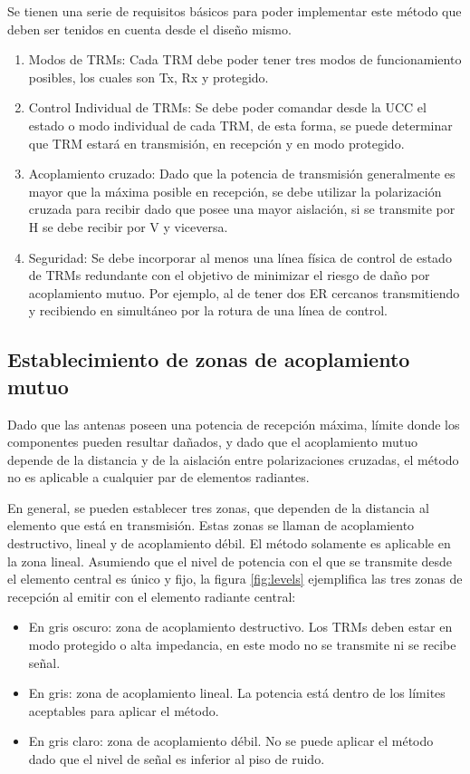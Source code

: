 Se tienen una serie de requisitos básicos para poder implementar este método que deben ser tenidos en cuenta desde el diseño
mismo.

\begin{enumerate}
	\item Modos de TRMs: Cada TRM debe poder tener tres modos de funcionamiento posibles, los cuales son Tx, Rx y protegido.
	\item Control Individual de TRMs: Se debe poder comandar desde la UCC el estado o modo individual de cada TRM, de esta forma, 
		se puede determinar que TRM estará en transmisión, en recepción y en modo protegido.
	\item Acoplamiento cruzado: Dado que la potencia de transmisión generalmente es mayor que la máxima posible en recepción, se
		debe utilizar la polarización cruzada para recibir dado que posee una mayor aislación, si se transmite por H se debe recibir
		por V y viceversa.
	\item Seguridad: Se debe incorporar al menos una línea física de control de estado de TRMs redundante con el objetivo de
		minimizar el riesgo de daño por acoplamiento mutuo. Por ejemplo, al de tener dos ER cercanos transmitiendo y recibiendo en
		simultáneo por la rotura de una línea de control.
\end{enumerate}


\subsection{Establecimiento de zonas de acoplamiento mutuo} \label{ssc:mutual_zone}

Dado que las antenas poseen una potencia de recepción máxima, límite donde los componentes pueden resultar dañados, y dado
que el acoplamiento mutuo depende de la distancia y de la aislación entre polarizaciones cruzadas, el método no es aplicable a
cualquier par de elementos radiantes.

En general, se pueden establecer tres zonas, que dependen de la distancia al elemento que está en transmisión. Estas zonas se
llaman de acoplamiento destructivo, lineal y de acoplamiento débil. El método solamente es aplicable en la zona lineal.
Asumiendo que el nivel de potencia con el que se transmite desde el elemento central es único y fijo, la figura \ref{fig:levels}
ejemplifica las tres zonas de recepción al emitir con el elemento radiante central:
\begin{itemize}
	\item En gris oscuro: zona de acoplamiento destructivo. Los TRMs deben estar en modo protegido o alta impedancia, en este modo
		no se transmite ni se recibe señal.
	\item En gris: zona de acoplamiento lineal. La potencia está dentro de los límites aceptables para aplicar el método.
	\item En gris claro: zona de acoplamiento débil. No se puede aplicar el método dado que el nivel de señal es inferior al piso
		de ruido. 
\end{itemize}


